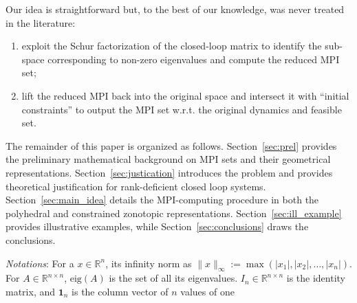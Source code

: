 \documentclass[journal,twoside,web]{ieeecolor}
\newcommand{\secref}[1]{Section~\ref{#1}\xspace}
\begin{document}
Our idea is straightforward but, to the best of our knowledge, was never treated in the literature:
\begin{enumerate}[label=\roman*)]
    \item exploit the Schur factorization of the closed-loop matrix to identify the sub-space corresponding to non-zero eigenvalues and compute the reduced MPI set;
    \item lift the reduced MPI back into the original space and intersect it with ``initial constraints'' to output the MPI set w.r.t. the original dynamics and feasible set. 
\end{enumerate}



The remainder of this paper is organized as follows. \secref{sec:prel} provides the preliminary mathematical background on MPI sets and their geometrical representations. \secref{sec:justication} introduces the problem and provides theoretical justification for rank-deficient closed loop systems. \secref{sec:main_idea} details the MPI-computing procedure in both the polyhedral and constrained zonotopic representations. \secref{sec:ill_example} provides illustrative examples, while \secref{sec:conclusions} draws the conclusions.


\noindent \textit{Notations}: For a $x \in \mathbb R^{n}$, its infinity norm as $\|x\|_{\infty} := \max(|x_1|, |x_2|, \ldots, |x_n|)$. For $A \in \mathbb R^{n\times n}$, $\text{eig}(A)$ is  the set of all its eigenvalues. $I_n\in \mathbb R^{n\times n}$ is the identity matrix, and $\mathbf{1}_n$ is the column vector of $n$ values of one 



\end{document}
